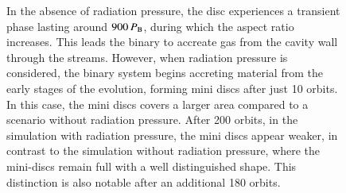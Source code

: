 \documentclass{aa}
\begin{document}
\begin{figure}[h]
\begin{center}
{    In the absence of radiation pressure, the disc experiences a transient phase lasting around $900 \, P_{\rm B}$, during which the aspect ratio increases. This leads the binary to accreate gas from the cavity wall through the streams. However, when radiation pressure is considered, the binary system begins accreting material from the early stages of the evolution, forming mini discs after just 10 orbits. In this case, the mini discs covers a larger area compared to a scenario without radiation pressure. 
    After 200 orbits, in the simulation with radiation pressure, the mini discs appear weaker, in contrast to the simulation without radiation pressure, where the mini-discs remain full with a well distinguished shape. This distinction is also notable after an additional 180 orbits. 
    }
    \label{fig:disc}
    \end{center}
\end{figure}
\end{document}
